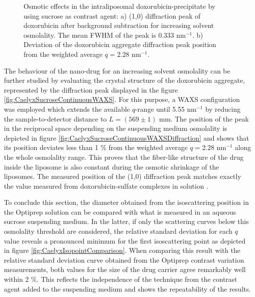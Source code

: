 \begin{figure}
	\centering
		\qquad
		\caption[Osmotic effects in the intraliposomal doxorubicin-precipitate.]{Osmotic effects in the intraliposomal doxorubicin-precipitate by using sucrose as contrast agent: a) (1,0) diffraction peak of doxorubicin after background subtraction for increasing solvent osmolality. The mean FWHM of the peak is 0.333  nm$^{-1}$. b) Deviation of the doxorubicin aggregate diffraction peak position from the weighted average $q=2.28$ nm$^{-1}$.}
\end{figure}

The behaviour of the nano-drug for an increasing solvent osmolality can be further studied by evaluating the crystal structure of the doxorubicin aggregate, represented by the diffraction peak displayed in the figure \ref{fig:CaelyxSucroseContinuousWAXS}. For this purpose, a WAXS configuration was employed which extends the available $q$-range until 5.55 nm$^{-1}$ by reducing the sample-to-detector distance to $L = (569 \pm  1)$ mm. The position of the peak in the reciprocal space depending on the suspending medium osmolality is depicted in figure \ref{fig:CaelyxSucroseContinuousWAXSDiffraction} and shows that its position deviates less than 1 $\%$ from the weighted average $q=2.28$ nm$^{-1}$ along the whole osmolality range. This proves that the fiber-like structure of the drug inside the liposome is also constant during the osmotic shrinkage of the liposomes. The measured position of the (1,0) diffraction peak matches exactly the value measured from doxorubicin-sulfate complexes in solution \citep{lasic_gelation_1992}. 

To conclude this section, the diameter obtained from the isoscattering position in the Optiprep solution can be compared with what is measured in an aqueous sucrose suspending medium. In the latter, if only the scattering curves below this osmolality threshold are considered, the relative standard deviation for each $q$ value reveals a pronounced minimum for the first isoscattering point as depicted in figure \ref{fig:CaelyxIsopointComparison}. When comparing this result with the relative standard deviation curve obtained from the Optiprep contrast variation measurements, both values for the size of the drug carrier agree remarkably well within 2 $\%$. This reflects the independence of the technique from the contrast agent added to the suspending medium and shows the repeatability of the results.

